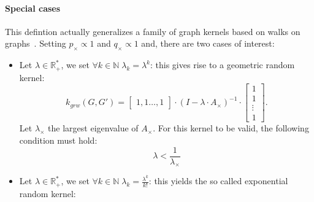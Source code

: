                 \paragraph{Special cases}
                    This defintion actually generalizes a family of graph kernels based on walks on graphs~\parencite{vishwanathan2010graph}.
                    Setting $p_{\times} \propto 1$ and $q_{\times} \propto 1$ and, there are two cases of interest:
                    \begin{itemize}
                        \item Let \(\lambda \in \mathbb{R}^*_+\), we set \(\forall k\in \mathbb{N} \; \lambda_k = \lambda^k\): this gives rise to a geometric random kernel:
                                \begin{equation}
                                    \label{eq::geometric_random_kernel}
                                    k_{grw}(G, G') = \begin{bmatrix}
                                        1, 1\dots,1
                                    \end{bmatrix}\cdot \left(I - \lambda\cdot A_{\times}\right)^{-1}\cdot\begin{bmatrix}
                                        1\\
                                        1\\
                                        \vdots\\
                                        1
                                    \end{bmatrix}.
                                \end{equation}
                                Let \(\lambda_{\times}\) the largest eigenvalue of \(A_{\times}\).
                                For this kernel to be valid, the following condition must hold:
                                \begin{equation}
                                    \label{eq::condition_geometric_kernel_convergence}
                                    \lambda < \frac{1}{\lambda_{\times}}
                                \end{equation}
                        \item Let \(\lambda \in \mathbb{R}^*_+\), we set \(\forall k\in \mathbb{N} \; \lambda_k = \frac{\lambda^k}{k!}\): this yields the so called exponential random kernel:
                                \begin{equation}

\end{equation}
\end{itemize}
